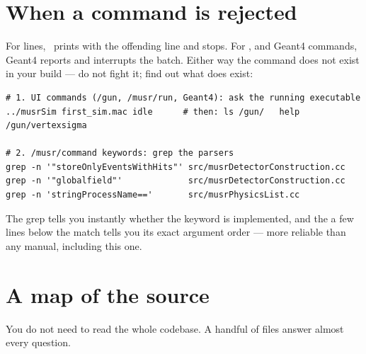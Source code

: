 \section{When a command is rejected}
\label{sec:rejected}
For  lines, \musrSim\ prints  with the offending line and stops. For ,  and Geant4 commands, Geant4 reports  and interrupts the batch. Either way the command does not exist in your build --- do not fight it; find out what does exist:

\begin{lstlisting}[style=sh,caption={Confirm a command against your own source}]
# 1. UI commands (/gun, /musr/run, Geant4): ask the running executable
../musrSim first_sim.mac idle      # then: ls /gun/   help /gun/vertexsigma

# 2. /musr/command keywords: grep the parsers
grep -n '"storeOnlyEventsWithHits"' src/musrDetectorConstruction.cc
grep -n '"globalfield"'             src/musrDetectorConstruction.cc
grep -n 'stringProcessName=='       src/musrPhysicsList.cc
\end{lstlisting}

The grep tells you instantly whether the keyword is implemented, and the  a few lines below the match tells you its exact argument order --- more reliable than any manual, including this one.

\section{A map of the source}
You do not need to read the whole codebase. A handful of files answer almost every question.

